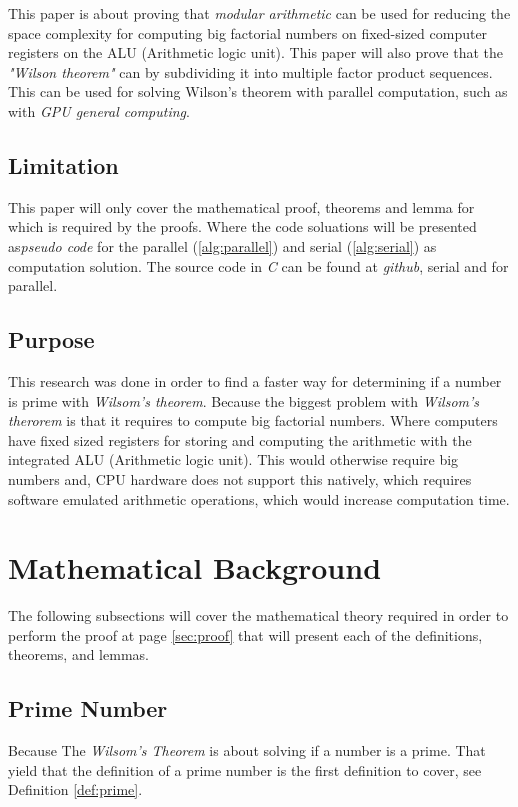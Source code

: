 \documentclass[12pt, oneside, onecolumn]{article}
\begin{document}
This paper is about proving that \emph{modular arithmetic} can be used for reducing the space complexity for computing big factorial numbers on fixed-sized computer registers on the ALU (Arithmetic logic unit). This paper will also prove that the \emph{"Wilson theorem"} can by subdividing it into multiple factor product sequences. This can be used for solving Wilson's theorem with parallel computation, such as with \emph{GPU general computing}.


\subsection{Limitation}
This paper will only cover the mathematical proof, theorems and lemma for which is required by the proofs. Where the code soluations will be presented as\emph{pseudo code} for the parallel (\ref{alg:parallel}) and serial (\ref{alg:serial}) as computation solution. The source code in \emph{C} can be found at \emph{github}, serial\cite{wprime} and for parallel\cite{clwprime}.


\subsection{Purpose}
This research was done in order to find a faster way for determining if a number is prime with \emph{Wilsom's theorem}. Because the biggest problem with \emph{Wilsom's therorem} is that it requires to compute big factorial numbers. Where computers have fixed sized registers for storing and computing the arithmetic with the integrated ALU (Arithmetic logic unit). This would otherwise require big numbers and, CPU hardware does not support this natively, which requires software emulated arithmetic operations, which would increase computation time.

\section{Mathematical Background}
The following subsections will cover the mathematical theory required in order to perform the proof at page \ref{sec:proof} that will present each of the definitions, theorems, and lemmas.

\subsection{Prime Number}
Because The \emph{Wilsom's Theorem} is about solving if a number is a prime. That yield that the definition of a prime number is the first definition to cover, see Definition \ref{def:prime}.
\end{document}
